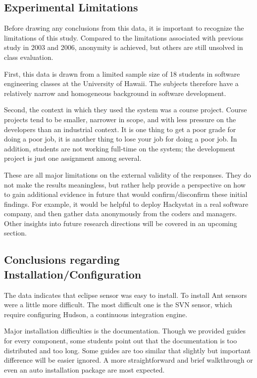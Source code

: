 \documentclass[11pt]{article}
\begin{document}
\subsection {Experimental Limitations}

Before drawing any conclusions from this data, it is important to recognize the limitations of this study. Compared to the limitations associated with previous study in 2003 and 2006, anonymity is achieved, but others are still unsolved in class evaluation.

First, this data is drawn from a limited sample size of 18 students in software engineering classes at the University of Hawaii. The subjects therefore have a relatively narrow and homogeneous background in software development.

Second, the context in which they used the system was a course project.  Course projects tend to be smaller, narrower in scope, and with less pressure on the developers than an industrial context.  It is one thing to get a poor grade for doing a poor job, it is another thing to lose your job for doing a poor job.  In addition, students are not working full-time on the system; the development project is just one assignment among several.  

These are all major limitations on the external validity of the responses.  They do not make the results meaningless, but rather help provide a perspective on how to gain additional evidence in future that would confirm/disconfirm these initial findings.  For example, it would be helpful to deploy Hackystat in a real software company, and then gather data anonymously from the coders and managers. Other insights into future research directions will be covered in an upcoming section.

\subsection {Conclusions regarding Installation/Configuration}
The data indicates that eclipse sensor was easy to install. To install Ant sensors were a little more difficult. The most difficult one is the SVN sensor, which require configuring Hudson, a continuous integration engine. 

Major installation difficulties is the documentation. Though we provided guides for every component, some students point out that the documentation is too distributed and too long. Some guides are too similar that slightly but important difference will be easier ignored. A more straightforward and brief walkthrough or even an auto installation package are most expected.
\end{document}
